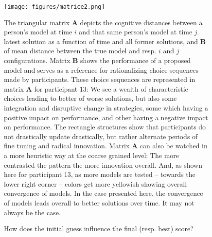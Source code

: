 \begin{figure}[h!]
\begin{center}
\texttt{[image: figures/matrice2.png]}
\caption{\footnotesize The triangular matrix {\bf A} depicts the cognitive distances between a person's model at time $i$ and that same person's model at time $j$.  latest solution as a function of time and all former solutions, and {\bf B} of mean distance between the true model and resp. $i$ and $j$ configurations. Matrix {\bf B} shows the performance of a proposed model and serves as a reference for rationalizing choice sequences made by participants. These choice sequences are represented in matrix {\bf A} for participant 13: We see a wealth of characteristic choices leading to better of worse solutions, but also some integration and disruptive change in strategies, some which having a positive impact on performance, and other having a negative impact on performance. The rectangle structures show that participants do not drastically update drastically, but rather alternate periods of fine tuning and radical innovation. Matrix {\bf A} can also be watched in a more heuristic way at the coarse grained level: The more contrasted the pattern the more innovation overall. And, as shown here for participant 13, as more models are tested -- towards the lower right corner -- colors get more yellowish showing overall convergence of models. In the case presented here, the convergence of models leads overall to better solutions over time. It may not always be the case.}
\label{fig:matrices}
\end{center}
\end{figure}


\vspace{1cm}
\begin{figure}[h]
\label{init_final_best}
\caption{How does the initial guess influence the final (resp. best) score?}
\label{figure1}
\end{figure}

